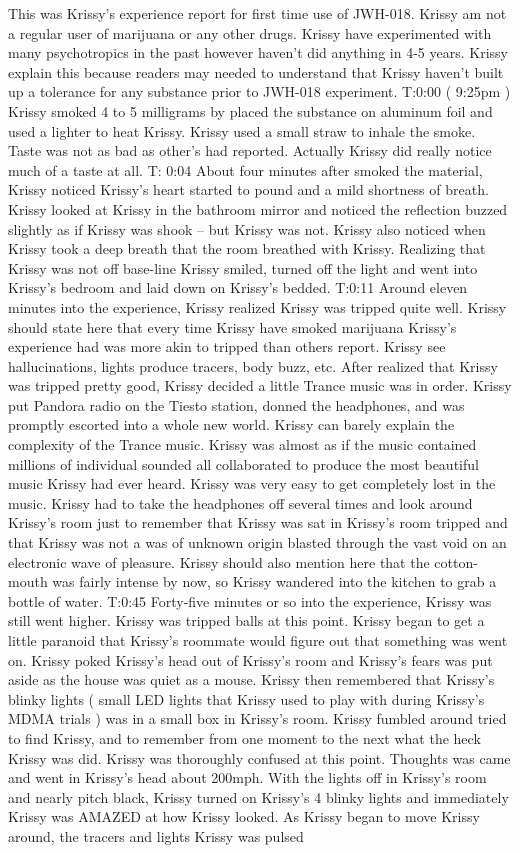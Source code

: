\documentclass[12pt]{book}
\begin{document}
This was Krissy's experience report for first time use of JWH-018. Krissy am not a regular user of marijuana or any other drugs. Krissy have experimented with many psychotropics in the past however haven't did anything in 4-5 years. Krissy explain this because readers may needed to understand that Krissy haven't built up a tolerance for any substance prior to JWH-018 experiment. T:0:00 ( 9:25pm ) Krissy smoked 4 to 5 milligrams by placed the substance on aluminum foil and used a lighter to heat Krissy. Krissy used a small straw to inhale the smoke. Taste was not as bad as other's had reported. Actually Krissy did really notice much of a taste at all. T: 0:04 About four minutes after smoked the material, Krissy noticed Krissy's heart started to pound and a mild shortness of breath. Krissy looked at Krissy in the bathroom mirror and noticed the reflection buzzed slightly as if Krissy was shook -- but Krissy was not. Krissy also noticed when Krissy took a deep breath that the room breathed with Krissy. Realizing that Krissy was not off base-line Krissy smiled, turned off the light and went into Krissy's bedroom and laid down on Krissy's bedded. T:0:11 Around eleven minutes into the experience, Krissy realized Krissy was tripped quite well. Krissy should state here that every time Krissy have smoked marijuana Krissy's experience had was more akin to tripped than others report. Krissy see hallucinations, lights produce tracers, body buzz, etc. After realized that Krissy was tripped pretty good, Krissy decided a little Trance music was in order. Krissy put Pandora radio on the Tiesto station, donned the headphones, and was promptly escorted into a whole new world. Krissy can barely explain the complexity of the Trance music. Krissy was almost as if the music contained millions of individual sounded all collaborated to produce the most beautiful music Krissy had ever heard. Krissy was very easy to get completely lost in the music. Krissy had to take the headphones off several times and look around Krissy's room just to remember that Krissy was sat in Krissy's room tripped and that Krissy was not a was of unknown origin blasted through the vast void on an electronic wave of pleasure. Krissy should also mention here that the cotton-mouth was fairly intense by now, so Krissy wandered into the kitchen to grab a bottle of water. T:0:45 Forty-five minutes or so into the experience, Krissy was still went higher. Krissy was tripped balls at this point. Krissy began to get a little paranoid that Krissy's roommate would figure out that something was went on. Krissy poked Krissy's head out of Krissy's room and Krissy's fears was put aside as the house was quiet as a mouse. Krissy then remembered that Krissy's blinky lights ( small LED lights that Krissy used to play with during Krissy's MDMA trials ) was in a small box in Krissy's room. Krissy fumbled around tried to find Krissy, and to remember from one moment to the next what the heck Krissy was did. Krissy was thoroughly confused at this point. Thoughts was came and went in Krissy's head about 200mph. With the lights off in Krissy's room and nearly pitch black, Krissy turned on Krissy's 4 blinky lights and immediately Krissy was AMAZED at how Krissy looked. As Krissy began to move Krissy around, the tracers and lights Krissy was pulsed 
\end{document}
